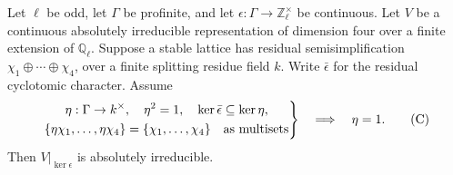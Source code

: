 \begin{srlemma}\label{lem:sr-rank-four-no-self-twist}
Let \(\ell\) be odd, let \(\Gamma\) be profinite, and let
\(\epsilon:\Gamma\to\mathbb Z_\ell^\times\) be continuous.
Let \(V\) be a continuous absolutely irreducible representation of
dimension four over a finite extension of \(\mathbb Q_\ell\).
Suppose a stable lattice has residual semisimplification
\(\chi_1\oplus\cdots\oplus\chi_4\), over a finite splitting residue
field \(k\). Write \(\bar\epsilon\) for the residual cyclotomic
character. Assume
\[
 \left.
 \begin{gathered}
 \eta:\Gamma\to k^\times,\quad \eta^2=1,\quad
            \ker\bar\epsilon\subseteq\ker\eta,\\
 \{\eta\chi_1,\ldots,\eta\chi_4\}
                     =\{\chi_1,\ldots,\chi_4\}
                   \quad\hbox{as multisets}
 \end{gathered}\right\}
                  \quad\Longrightarrow\quad\eta=1.
 \tag{C}
\]
Then \(V|_{\ker\epsilon}\) is absolutely irreducible.
\end{srlemma}
